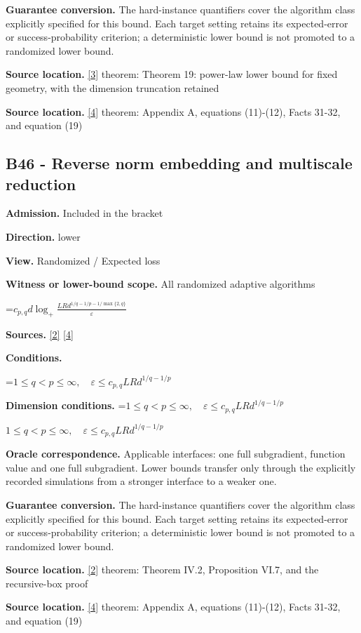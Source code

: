\documentclass[10pt,a4paper]{article}
\newcommand{\AtlasMath}[1]{\par\begingroup\centering\setbox0=\hbox{$\displaystyle #1$}\ifdim\wd0>1.4\linewidth\typeout{ATLAS WIDE FORMULA: \the\wd0}\fi\ifdim\wd0>\linewidth\resizebox{\linewidth}{!}{\box0}\else\box0\fi\par\endgroup}
\newcommand{\AtlasInlineMath}[1]{\begingroup\setbox0=\hbox{$#1$}\ifdim\wd0>.4\linewidth\endgroup\AtlasMath{#1}\else\endgroup$#1$\fi}
\begin{document}
\textbf{Guarantee conversion.} The hard-instance quantifiers cover the algorithm class explicitly specified for this bound. Each target setting retains its expected-error or success-probability criterion; a deterministic lower bound is not promoted to a randomized lower bound.

\textbf{Source location.} \href{https://arxiv.org/pdf/2609.20701}{[3]} theorem: Theorem 19: power-law lower bound for fixed geometry, with the dimension truncation retained

\textbf{Source location.} \href{https://arxiv.org/pdf/2609.20687}{[4]} theorem: Appendix A, equations (11)-(12), Facts 31-32, and equation (19)

\subsection{B46 - Reverse norm embedding and multiscale reduction}
\textbf{Admission.} Included in the bracket

\textbf{Direction.} lower

\textbf{View.} Randomized / Expected loss

\textbf{Witness or lower-bound scope.} All randomized adaptive algorithms

\AtlasMath{c_{p,q}d\log_+\frac{LRd^{1/q-1/p-1/\max\{2,q\}}}{\varepsilon}}
\textbf{Sources.} \href{https://arxiv.org/pdf/1407.5144}{[2]} \href{https://arxiv.org/pdf/2609.20687}{[4]}

\textbf{Conditions.} 
\AtlasMath{1\le q<p\le\infty,\quad\varepsilon\le c_{p,q}LRd^{1/q-1/p}}


\textbf{Dimension conditions.} \AtlasInlineMath{1\le q<p\le\infty,\quad\varepsilon\le c_{p,q}LRd^{1/q-1/p}}

\textbf{Oracle correspondence.} Applicable interfaces: one full subgradient, function value and one full subgradient. Lower bounds transfer only through the explicitly recorded simulations from a stronger interface to a weaker one.

\textbf{Guarantee conversion.} The hard-instance quantifiers cover the algorithm class explicitly specified for this bound. Each target setting retains its expected-error or success-probability criterion; a deterministic lower bound is not promoted to a randomized lower bound.

\textbf{Source location.} \href{https://arxiv.org/pdf/1407.5144}{[2]} theorem: Theorem IV.2, Proposition VI.7, and the recursive-box proof

\textbf{Source location.} \href{https://arxiv.org/pdf/2609.20687}{[4]} theorem: Appendix A, equations (11)-(12), Facts 31-32, and equation (19)
\end{document}
